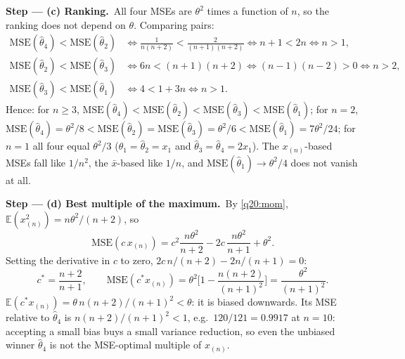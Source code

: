 \documentclass[11pt,a4paper]{article}
\numberwithin{equation}{questao}   %
\newcommand{\passo}[2]{\par\smallskip\noindent\textbf{Step --- #1.}~#2}
\newcommand{\E}{\mathbb{E}}
\begin{document}
\begin{sol}
\passo{(c) Ranking}{All four MSEs are $\theta^2$ times a function of $n$, so the ranking does not
depend on $\theta$. Comparing pairs:}
\begin{align*}
\mathrm{MSE}(\hat\theta_4)<\mathrm{MSE}(\hat\theta_2)&\iff\frac1{n(n+2)}<\frac2{(n+1)(n+2)}\iff n+1<2n\iff n>1,\\
\mathrm{MSE}(\hat\theta_2)<\mathrm{MSE}(\hat\theta_3)&\iff6n<(n+1)(n+2)\iff(n-1)(n-2)>0\iff n>2,\\
\mathrm{MSE}(\hat\theta_3)<\mathrm{MSE}(\hat\theta_1)&\iff4<1+3n\iff n>1 .
\end{align*}
Hence: for $n\ge3$, $\mathrm{MSE}(\hat\theta_4)<\mathrm{MSE}(\hat\theta_2)<\mathrm{MSE}(\hat\theta_3)<\mathrm{MSE}(\hat\theta_1)$;
for $n=2$, $\mathrm{MSE}(\hat\theta_4)=\theta^2/8<\mathrm{MSE}(\hat\theta_2)=\mathrm{MSE}(\hat\theta_3)=\theta^2/6<\mathrm{MSE}(\hat\theta_1)=7\theta^2/24$;
for $n=1$ all four equal $\theta^2/3$ ($\hat\theta_1=\hat\theta_2=x_1$ and $\hat\theta_3=\hat\theta_4=2x_1$).
The $x_{(n)}$-based MSEs fall like $1/n^2$, the $\bar x$-based like $1/n$, and
$\mathrm{MSE}(\hat\theta_1)\to\theta^2/4$ does not vanish at all.

\passo{(d) Best multiple of the maximum}{By \eqref{q20:mom},
$\E(x_{(n)}^2)=n\theta^2/(n+2)$, so}
\begin{equation}\label{q20:mc}
\mathrm{MSE}(c\,x_{(n)})=c^2\frac{n\theta^2}{n+2}-2c\,\frac{n\theta^2}{n+1}+\theta^2 .
\end{equation}
Setting the derivative in $c$ to zero, $2c\,n/(n+2)-2n/(n+1)=0$:
\begin{equation}\label{q20:cstar}
c^*=\frac{n+2}{n+1},\qquad
\mathrm{MSE}(c^*x_{(n)})=\theta^2\Big[1-\frac{n(n+2)}{(n+1)^2}\Big]=\frac{\theta^2}{(n+1)^2} .
\end{equation}
$\E(c^*x_{(n)})=\theta\,n(n+2)/(n+1)^2<\theta$: it is biased downwards. Its MSE relative to
$\hat\theta_4$ is $n(n+2)/(n+1)^2<1$, e.g.\ $120/121=0.9917$ at $n=10$: accepting a small bias buys a
small variance reduction, so even the unbiased winner $\hat\theta_4$ is not the MSE-optimal multiple
of $x_{(n)}$.


\end{sol}
\end{document}
